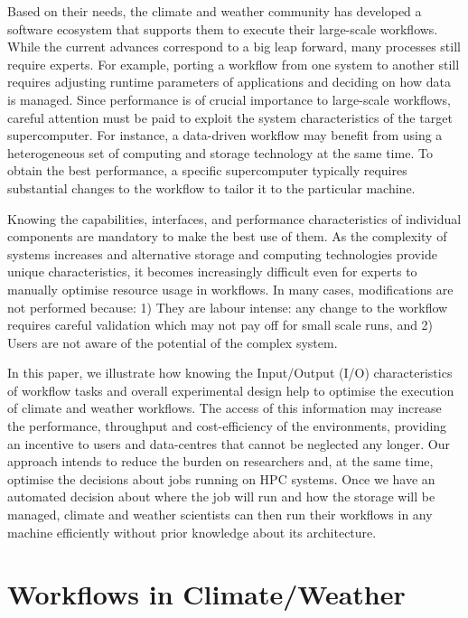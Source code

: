 \documentclass{superfri}
\begin{document}
Based on their needs, the climate and weather community has developed a software ecosystem that supports them to execute their large-scale workflows.
While the current advances correspond to a big leap forward, many processes still require experts.
For example, porting a workflow from one system to another still requires adjusting runtime parameters of applications and deciding on how data is managed.
Since performance is of crucial importance to large-scale workflows, careful attention must be paid to exploit the system characteristics of the target supercomputer.
For instance, a data-driven workflow may benefit from using a heterogeneous set of computing and storage technology at the same time.
To obtain the best performance, a specific supercomputer typically requires substantial changes to the workflow to tailor it to the particular machine.

Knowing the capabilities, interfaces, and performance characteristics of individual components are mandatory to make the best use of them.
As the complexity of systems increases and alternative storage and computing technologies provide unique characteristics, it becomes increasingly difficult even for experts to manually optimise resource usage in workflows.
In many cases, modifications are not performed because: 1) They are labour intense: any change to the workflow requires careful validation which may not pay off for small scale runs, and 2) Users are not aware of the potential of the complex system.

In this paper, we illustrate how knowing the Input/Output (I/O) characteristics of workflow tasks and overall experimental design help to optimise the execution of climate and weather workflows. The access of this information may increase the performance, throughput and cost-efficiency of the environments, providing an incentive to users and data-centres that cannot be neglected any longer.
Our approach intends to reduce the burden on researchers and, at the same time, optimise the decisions about jobs running on HPC systems.
Once we have an automated decision about where the job will run and how the storage will be managed, climate and weather scientists can then run their workflows in any machine efficiently without prior knowledge about its architecture.

\section{Workflows in Climate/Weather}
\label{sec:workflows}
\end{document}
